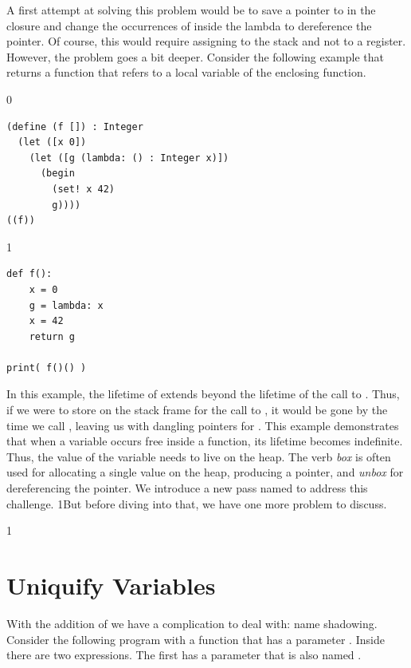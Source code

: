 \documentclass[7x10]{TimesAPriori_MIT}%
\def\racketEd{0}
\def\pythonEd{1}
\def\edition{0}
\newcommand{\python}[1]{{\if\edition\pythonEd #1\fi}}
\numberwithin{theorem}{chapter}
\numberwithin{definition}{chapter}
\numberwithin{equation}{chapter}
\begin{document}
A first attempt at solving this problem would be to save a pointer to
 in the closure and change the occurrences of  inside
the lambda to dereference the pointer. Of course, this would require
assigning  to the stack and not to a register. However, the
problem goes a bit deeper.
Consider the following example that returns a function that refers to
a local variable of the enclosing function.
\begin{center}
\begin{minipage}{\textwidth}
{\if\edition\racketEd
\begin{lstlisting}
(define (f []) : Integer
  (let ([x 0])
    (let ([g (lambda: () : Integer x)])
      (begin
        (set! x 42)
        g))))
((f))
\end{lstlisting}
\fi}
{\if\edition\pythonEd
\begin{lstlisting}
def f():
    x = 0
    g = lambda: x
    x = 42
    return g

print( f()() )
\end{lstlisting}
\fi}
\end{minipage}
\end{center}
In this example, the lifetime of  extends beyond the lifetime
of the call to . Thus, if we were to store  on the
stack frame for the call to , it would be gone by the time we
call , leaving us with dangling pointers for
. This example demonstrates that when a variable occurs free
inside a function, its lifetime becomes indefinite. Thus, the value of
the variable needs to live on the heap.  The verb
\emph{box} is often used for allocating a single
value on the heap, producing a pointer, and
\emph{unbox} for dereferencing the pointer.
%
We introduce a new pass named  to address
this challenge.
%
\python{But before diving into that, we have one more
  problem to discuss.}

\if\edition\pythonEd
\section{Uniquify Variables}
\label{sec:uniquify-lambda}

With the addition of  we have a complication to deal
with: name shadowing. Consider the following program with a function
 that has a parameter . Inside  there are two
 expressions. The first  has a parameter
that is also named .
\end{document}
